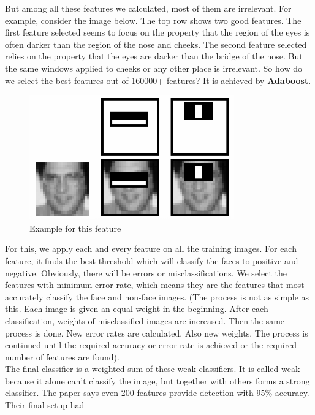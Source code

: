             \vspace{3mm}
            But among all these features we calculated, most of them are irrelevant. For example, consider the image below. The top row shows two good features. The first feature selected seems to focus on the property that the region of the eyes is often darker than the region of 
            the nose and cheeks. The second feature selected relies on the property that the eyes are darker than the bridge of the nose. But the same windows applied to cheeks or any other place is irrelevant. So how do we select the best features out of 160000+ features? 
            It is achieved by \textbf{Adaboost}.
            \begin{figure}[H]
                \centering
                \includegraphics[width=0.6\linewidth]{img/haar_example.png}
                \caption{Example for this feature}
            \end{figure}
            For this, we apply each and every feature on all the training images. For each feature, it finds the best threshold which will classify the faces to positive and negative. Obviously, there will be errors or misclassifications. We select the features with minimum error rate, 
            which means they are the features that most accurately classify the face and non-face images. (The process is not as simple as this. Each image is given an equal weight in the beginning. After each classification, weights of misclassified images are increased. Then the same 
            process is done. New error rates are calculated. Also new weights. The process is continued until the required accuracy or error rate is achieved or the required number of features are found). \\ 
            \vspace{3mm}
            The final classifier is a weighted sum of these weak classifiers. It is called weak because it alone can't classify the image, but together with others forms a strong classifier. The paper says even 200 features provide detection with 95\% accuracy. Their final setup had 
